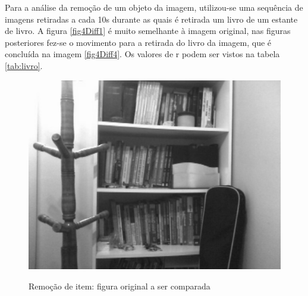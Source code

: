 \documentclass[10pt,a4paper]{article}
\begin{document}

Para a análise da remoção de um objeto da imagem, utilizou-se uma
sequência de imagens retiradas a cada 10s durante as quais é retirada
um livro de um estante de livro.
A figura \ref{fig4Diff1} é muito semelhante à imagem original, nas
figuras posteriores fez-se o movimento para a retirada do livro da
imagem, que é concluída na imagem \ref{fig4Diff4}.
Os valores de r podem ser vistos na tabela \ref{tab:livro}.

\begin{figure}[h!]
\begin{center}
\includegraphics[scale=0.35]{photos/livros/gBase} \label{livro}
\caption{Remoção de item: figura original a ser comparada}
\end{center}
\end{figure}

\newpage
\end{document}
